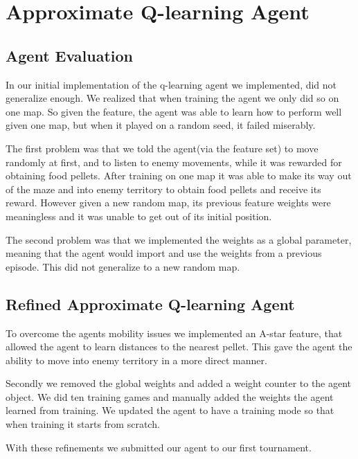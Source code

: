 \documentclass[11pt]{article}
\begin{document}
\section{Approximate Q-learning Agent}

\subsection{Agent Evaluation}
In our initial implementation of the q-learning agent we implemented, did not generalize enough. We realized
that when training the agent we only did so on one map. So given the feature, the agent
was able to learn how to perform well given one map, but when it played on a random seed, it
failed miserably. \

The first problem was that we told the agent(via the feature set) to move randomly at first, and to listen to
enemy movements, while it was rewarded for obtaining food pellets.
After training on one map it was able to make its way out of the maze and into
enemy territory to obtain food pellets and receive its reward. However given a new random map,
its previous feature weights were meaningless and it was unable to get out of its initial position. \

The second problem was that we implemented the weights as a global parameter, meaning that
the agent would import and use the weights from a previous episode. This did not generalize to
a new random map.\

\subsection{Refined Approximate Q-learning Agent}
To overcome the agents mobility issues we implemented an A-star feature, that allowed
the agent to learn distances to the nearest pellet. This gave the agent the ability to
move into enemy territory in a more direct manner. \

Secondly we removed the global weights and added a weight counter to the agent object.
We did ten training games and manually added the weights the agent learned from
training. We updated the agent to have a training mode so that when training
it starts from scratch.\

With these refinements we submitted our agent to our first tournament.\
\end{document}
